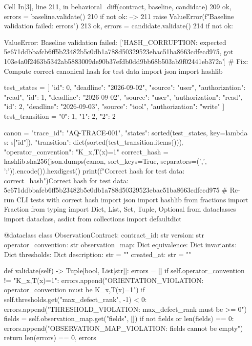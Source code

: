 Cell In[3], line 211, in behavioral_diff(contract, baseline, candidate)
    209 ok, errors = baseline.validate()
    210 if not ok:
--> 211     raise ValueError(f"Baseline validation failed: {errors}")
    213 ok, errors = candidate.validate()
    214 if not ok:

ValueError: Baseline validation failed: ['HASH_CORRUPTION: expected 5e671ddbbafcb6ff5b23482b5c0db1a788d50329523ebac51ba8663cdfecd975, got 103e4a0f2463b5342ab5883009de90b37efdb0dd9bb68b503ab9f02441eb372a']
# Fix: Compute correct canonical hash for test data
import json
import hashlib

test_states = [
    {"id": 0, "deadline": "2026-09-02", "source": "user", "authorization": "read"},
    {"id": 1, "deadline": "2026-09-02", "source": "user", "authorization": "read"},
    {"id": 2, "deadline": "2026-09-03", "source": "tool", "authorization": "write"}
]
test_transition = {"0": 1, "1": 2, "2": 2}

canon = {
    "trace_id": "AQ-TRACE-001",
    "states": sorted(test_states, key=lambda s: s["id"]),
    "transition": dict(sorted(test_transition.items())),
    "operator_convention": "K_x,T(x)=1"
}
correct_hash = hashlib.sha256(json.dumps(canon, sort_keys=True, separators=(',', ':')).encode()).hexdigest()
print(f"Correct hash for test data: {correct_hash}")Correct hash for test data: 5e671ddbbafcb6ff5b23482b5c0db1a788d50329523ebac51ba8663cdfecd975
# Re-run CLI tests with correct hash
import json
import hashlib
from fractions import Fraction
from typing import Dict, List, Set, Tuple, Optional
from dataclasses import dataclass, asdict
from collections import defaultdict

@dataclass
class ObservationContract:
    contract_id: str
    version: str
    operator_convention: str
    observation_map: Dict
    equivalence: Dict
    invariants: Dict
    thresholds: Dict
    description: str = ""
    created_at: str = ""
    
    def validate(self) -> Tuple[bool, List[str]]:
        errors = []
        if self.operator_convention != "K_x,T(x)=1":
            errors.append("ORIENTATION_VIOLATION: operator_convention must be K_x,T(x)=1")
        if self.thresholds.get("max_defect_rank", -1) < 0:
            errors.append("THRESHOLD_VIOLATION: max_defect_rank must be >= 0")
        fields = self.observation_map.get("fields", [])
        if not fields or len(fields) == 0:
            errors.append("OBSERVATION_MAP_VIOLATION: fields cannot be empty")
        return len(errors) == 0, errors

